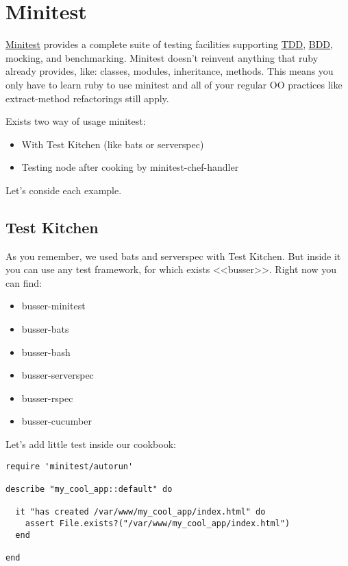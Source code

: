 \section{Minitest}
\label{sec:testing-minitest}

\href{https://github.com/seattlerb/minitest}{Minitest} provides a complete suite of testing facilities supporting \href{http://en.wikipedia.org/wiki/Test-driven\_development}{TDD}, \href{http://en.wikipedia.org/wiki/Behavior-driven\_development}{BDD}, mocking, and benchmarking. Minitest doesn't reinvent anything that ruby already provides, like: classes, modules, inheritance, methods. This means you only have to learn ruby to use minitest and all of your regular OO practices like extract-method refactorings still apply.

Exists two way of usage minitest:

\begin{itemize}
  \item With Test Kitchen (like bats or serverspec)
  \item Testing node after cooking by minitest-chef-handler
\end{itemize}

Let's conside each example.

\subsection{Test Kitchen}

As you remember, we used bats and serverspec with Test Kitchen. But inside it you can use any test framework, for which exists <<busser>>. Right now you can find:

\begin{itemize}
  \item busser-minitest
  \item busser-bats
  \item busser-bash
  \item busser-serverspec
  \item busser-rspec
  \item busser-cucumber
\end{itemize}

Let's add little test inside our cookbook:

\begin{lstlisting}[label=lst:testing-minitest1]
require 'minitest/autorun'

describe "my_cool_app::default" do

  it "has created /var/www/my_cool_app/index.html" do
    assert File.exists?("/var/www/my_cool_app/index.html")
  end

end
\end{lstlisting}


